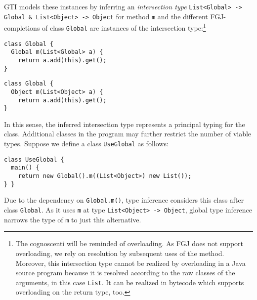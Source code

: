 GTI models these instances by inferring an \emph{intersection type}
\texttt{List<Global> -> Global \& List<Object> -> Object}
for method \texttt{m} and the different FGJ-completions of class \texttt{Glo\-bal} are
instances of the intersection type:\footnote{The cognoscenti will be
  reminded of overloading. As FGJ does not support overloading,
  we rely on resolution by subsequent uses of the method. Moreover,
  this intersection type cannot be realized by overloading in a Java
  source program because it is resolved according to the raw classes
  of the arguments, in this case \lstinline{List}. It can be realized
  in bytecode which supports overloading on the return type, too.%
}
\begin{center}
  \begin{minipage}{0.49\linewidth}
\begin{lstlisting}[style=fgj]
class Global {
  Global m(List<Global> a) {
    return a.add(this).get();
}
\end{lstlisting}
  \end{minipage}
  \begin{minipage}{0.49\linewidth}
\begin{lstlisting}[style=fgj]
class Global {
  Object m(List<Object> a) {
    return a.add(this).get();
}
\end{lstlisting}
  \end{minipage}
\end{center}
In this sense, the inferred intersection type represents a principal
typing for the class.
Additional classes in the program may further restrict the number of
viable types. Suppose we define a class \texttt{UseGlobal} as
follows:
\begin{lstlisting}[style=tfgj]
class UseGlobal {
  main() {
    return new Global().m((List<Object>) new List());
} }
\end{lstlisting}
Due to the dependency on \texttt{Global.m()}, type inference considers this class after class
\texttt{Global}. As it uses \texttt{m} at type
\texttt{List<Object> -> Object}, global type inference narrows the
type of \texttt{m} to just this alternative.


